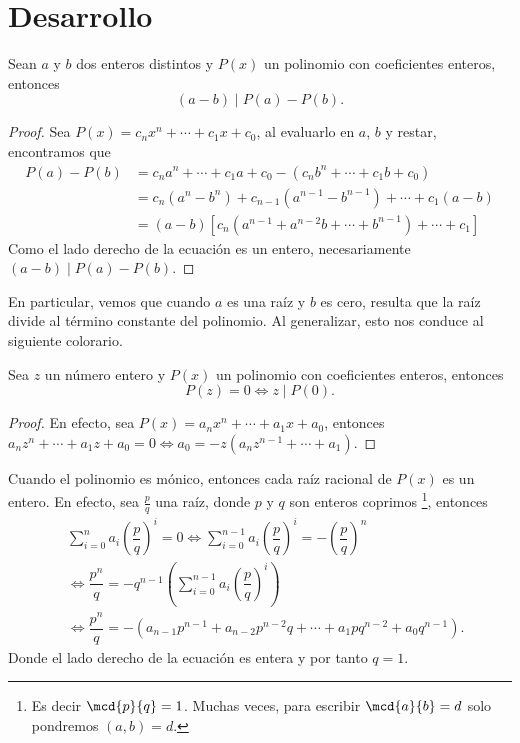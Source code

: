 \section{Desarrollo}

\begin{theorem.tcb}{}{}
    Sean $a$ y $b$ dos enteros distintos y $P(x)$ un polinomio con coeficientes enteros, entonces
    \[
        (a - b) \mid P(a) - P(b).
    \]
\end{theorem.tcb}
\begin{proof}
    Sea $P(x) = c_n x^n + \cdots + c_1 x + c_0$, al evaluarlo en $a$, $b$ y restar, encontramos que
    \begin{align*}
        P(a) - P(b) &= c_n a^n + \cdots + c_1 a + c_0 - (c_n b^n + \cdots + c_1 b + c_0)\\[1.2mm]
        &= c_n (a^n - b^n) + c_{n - 1} (a^{n - 1} - b^{n - 1}) + \cdots + c_1(a - b)\\[1.2mm]
        &= (a - b)\left[c_n (a^{n - 1} + a^{n - 2}b +\cdots + b^{n - 1}) + \cdots + c_1\right]
    \end{align*}
    Como el lado derecho de la ecuación es un entero, necesariamente $(a - b) \mid P(a) - P(b)$.
\end{proof}
En particular, vemos que cuando $a$ es una raíz y $b$ es cero, resulta que la raíz divide al término constante del polinomio.
Al generalizar, esto nos conduce al siguiente colorario.

\begin{corollary}
    Sea $z$ un número entero y $P(x)$ un polinomio con coeficientes enteros, entonces
    \[
        P(z) = 0 \iff z \mid P(0).
    \]
\end{corollary}
\begin{proof}
    En efecto, sea $P(x) = a_n x^n + \cdots + a_1 x + a_0$, entonces $a_n z^n + \cdots + a_1 z + a_0 = 0 \iff a_0 = -z(a_n z^{n - 1} + \cdots + a_1)$.
\end{proof}

Cuando el polinomio es mónico, entonces cada raíz racional de $P(x)$ es un entero.
En efecto, sea $\frac{p}{q}$ una raíz, donde $p$ y $q$ son enteros coprimos
\footnote{Es decir $\mcd{p}{q} = 1$. Muchas veces, para escribir $\mcd{a}{b} = d$ solo pondremos $(a,b) = d$.}, entonces
\begin{align*}
    &\sum_{i = 0}^{n} a_i \left(\dfrac{p}{q}\right)^{i} = 0 \iff \sum_{i = 0}^{n - 1} a_i \left(\dfrac{p}{q}\right)^{i} = -\left(\dfrac{p}{q}\right)^{n}\\
    &\iff \dfrac{p^n}{q}= - q^{n - 1} \left(\sum_{i = 0}^{n - 1} a_i \left(\dfrac{p}{q}\right)^{i}\right)\\
    &\iff \dfrac{p^n}{q} = -\left(a_{n - 1} p^{n - 1} + a_{n - 2} p^{n - 2} q + \cdots + a_1 p q^{n - 2} + a_0 q^{n - 1}\right).
\end{align*}
Donde el lado derecho de la ecuación es entera y por tanto $q = 1$.

